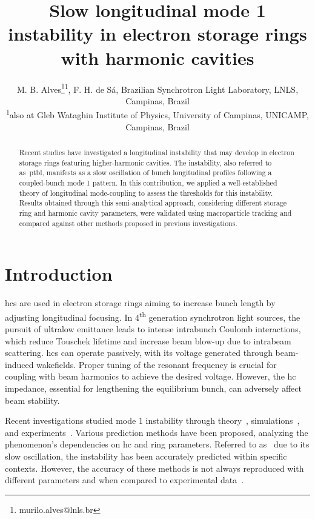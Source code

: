 \documentclass[a4paper,
               ]{jacow}
\begin{document}
\title{Slow longitudinal mode 1 instability in electron storage rings with harmonic cavities}

\author{M. B. Alves\thanks{murilo.alves@lnls.br}\textsuperscript{1}, F. H. de Sá, Brazilian Synchrotron Light Laboratory, LNLS, Campinas, Brazil\\
		\textsuperscript{1}also at Gleb Wataghin Institute of Physics, University of Campinas, UNICAMP, Campinas, Brazil}
\maketitle

%
\begin{abstract}
Recent studies have investigated a longitudinal instability that may develop in electron storage rings featuring higher-harmonic cavities. The instability, also referred to as~\gls{ptbl}, manifests as a slow oscillation of bunch longitudinal profiles following a coupled-bunch mode 1 pattern. In this contribution, we applied a well-established theory of longitudinal mode-coupling to assess the thresholds for this instability. Results obtained through this semi-analytical approach, considering different storage ring and harmonic cavity parameters, were validated using macroparticle tracking and compared against other methods proposed in previous investigations.
\end{abstract}
\section{Introduction}
\glspl{hc} are used in electron storage rings aiming to increase bunch length by adjusting longitudinal focusing. In 4\textsuperscript{th} generation synchrotron light sources, the pursuit of ultralow emittance leads to intense intrabunch Coulomb interactions, which reduce Touschek lifetime and increase beam blow-up due to intrabeam scattering. \glspl{hc} can operate passively, with its voltage generated through beam-induced wakefields. Proper tuning of the resonant frequency is crucial for coupling with beam harmonics to achieve the desired voltage. However, the \gls{hc} impedance, essential for lengthening the equilibrium bunch, can adversely affect beam stability.

Recent investigations studied mode 1 instability through theory~\cite{Venturini2018, He2022b}, simulations~\cite{He2022a}, and experiments~\cite{Cullinan2024}. Various prediction methods have been proposed, analyzing the phenomenon's dependencies on \gls{hc} and ring parameters. Referred to as~ due to its slow oscillation, the instability has been accurately predicted within specific contexts. However, the accuracy of these methods is not always reproduced with different parameters and when compared to experimental data~\cite{Cullinan2024}.
\end{document}
